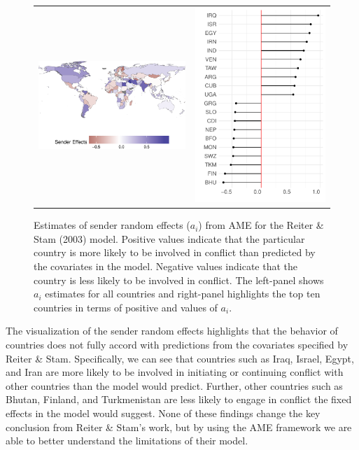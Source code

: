 \begin{figure}[ht]
	\begin{tabular}{cc}
	\includegraphics[width=.7\textwidth]{graphics/reiter_stam_aEff_map.pdf} &
	\includegraphics[width=.3\textwidth]{graphics/reiter_stam_aEff_line.pdf} \\
	\end{tabular}
	\caption{Estimates of sender random effects ($a_{i}$) from AME for the Reiter \& Stam (2003) model. Positive values indicate that the particular country is more likely to be involved in conflict than predicted by the covariates in the model. Negative values indicate that the country is less likely to be involved in conflict. The left-panel shows $a_{i}$ estimates for all countries and right-panel highlights the top ten countries in terms of positive and values of $a_{i}$.}
	\label{fig:reiter_stam_aEff}
\end{figure}
\FloatBarrier

The visualization of the sender random effects highlights that the behavior of countries does not fully accord with predictions from the covariates specified by Reiter \& Stam. Specifically, we can see that countries such as Iraq, Israel, Egypt, and Iran are more likely to be involved in initiating or continuing conflict with other countries than the model would predict. Further, other countries such as Bhutan, Finland, and Turkmenistan are less likely to engage in conflict the fixed effects in the model would suggest. None of these findings change the key conclusion from Reiter \& Stam's work, but by using the AME framework we are able to better understand the limitations of their model.

